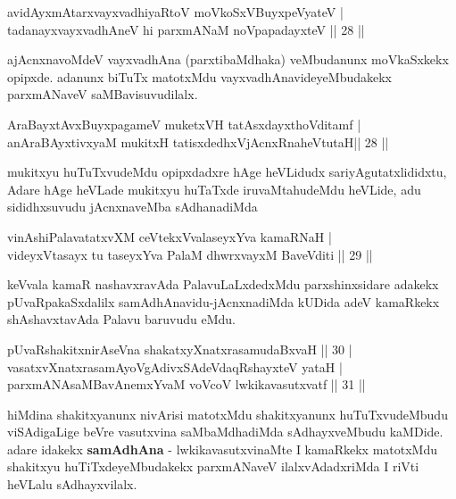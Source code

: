 \begin{shl}
avidAyxmAtarxvayxvadhiyaRtoV moVkoSxV\s BuyxpeVyateV |\\
tadanayxvayxvadhAneV hi parxmANaM noVpapadayxteV \hfill || 28 ||
\end{shl}

\begin{artha}
ajAcnxnavoMdeV vayxvadhAna (parxtibaMdhaka) veMbudanunx moVkaSxkekx opipxde. adanunx biTuTx matotxMdu vayxvadhAnavideyeMbudakekx parxmANaveV saMBavisuvudilalx.
\end{artha}


\begin{shl}
AraBayxtAvxBuyxpagameV muketxVH tatAsxdayxthoVditamf |\\
anAraBAyxtivxyaM mukitxH tatisxdedhxVjAcnxRnaheVtutaH\hfill || 28 ||
\end{shl}

\begin{artha}
mukitxyu huTuTxvudeMdu opipxdadxre hAge heVLidudx sariyAgutatxlididxtu, Adare hAge heVLade mukitxyu huTaTxde iruvaMtahudeMdu heVLide, adu sididhxsuvudu jAcnxnaveMba sAdhanadiMda
\end{artha}


\begin{shl}
vinAshiPalavatatxvXM ceVtekxVvalaseyxYva kamaRNaH |\\
videyxVtasayx tu taseyxYva PalaM dhwrxvayxM BaveVditi \hfill || 29 ||
\end{shl}

\begin{artha}
keVvala kamaR nashavxravAda PalavuLaLxdedxMdu parxshinxsidare adakekx pUvaRpakaSxdalilx samAdhAnavidu-jAcnxnadiMda kUDida adeV kamaRkekx shAshavxtavAda Palavu baruvudu eMdu.
\end{artha}


\begin{shl}
pUvaRshakitxnirAseVna shakatxyXnatxrasamudaBxvaH \hfill || 30 |\\
vasatxvXnatxrasamAyoVgAdivxSAdeVdaqRshayxteV yataH |\\
parxmANAsaMBavAnemxYvaM voVcoV lwkikavasutxvatf \hfill || 31 ||
\end{shl}

\begin{artha}
hiMdina shakitxyanunx nivArisi matotxMdu shakitxyanunx huTuTxvudeMbudu viSAdigaLige beVre vasutxvina saMbaMdhadiMda sAdhayxveMbudu kaMDide. adare idakekx \textbf{samAdhAna} - lwkikavasutxvinaMte I kamaRkekx matotxMdu shakitxyu huTiTxdeyeMbudakekx parxmANaveV ilalxvAdadxriMda I riVti heVLalu sAdhayxvilalx.
\end{artha}

